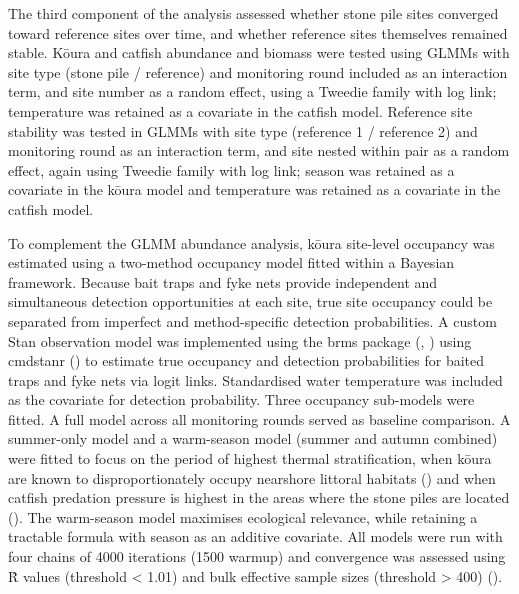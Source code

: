 \documentclass[
  letterpaper,
  DIV=11,
  numbers=noendperiod]{scrartcl}
\begin{document}
The third component of the analysis assessed whether stone pile sites
converged toward reference sites over time, and whether reference sites
themselves remained stable. Kōura and catfish abundance and biomass were
tested using GLMMs with site type (stone pile / reference) and
monitoring round included as an interaction term, and site number as a
random effect, using a Tweedie family with log link; temperature was
retained as a covariate in the catfish model. Reference site stability
was tested in GLMMs with site type (reference 1 / reference 2) and
monitoring round as an interaction term, and site nested within pair as
a random effect, again using Tweedie family with log link; season was
retained as a covariate in the kōura model and temperature was retained
as a covariate in the catfish model.

To complement the GLMM abundance analysis, kōura site-level occupancy
was estimated using a two-method occupancy model fitted within a
Bayesian framework. Because bait traps and fyke nets provide independent
and simultaneous detection opportunities at each site, true site
occupancy could be separated from imperfect and method-specific
detection probabilities. A custom Stan observation model was implemented
using the brms package (,
) using cmdstanr
() to estimate true
occupancy and detection probabilities for baited traps and fyke nets via
logit links. Standardised water temperature was included as the
covariate for detection probability. Three occupancy sub-models were
fitted. A full model across all monitoring rounds served as baseline
comparison. A summer-only model and a warm-season model (summer and
autumn combined) were fitted to focus on the period of highest thermal
stratification, when kōura are known to disproportionately occupy
nearshore littoral habitats () and when catfish predation pressure is highest in the areas where
the stone piles are located (). The warm-season model maximises ecological relevance,
while retaining a tractable formula with season as an additive
covariate. All models were run with four chains of 4000 iterations (1500
warmup) and convergence was assessed using R̂ values (threshold
\textless{} 1.01) and bulk effective sample sizes (threshold
\textgreater{} 400) ().
\end{document}
